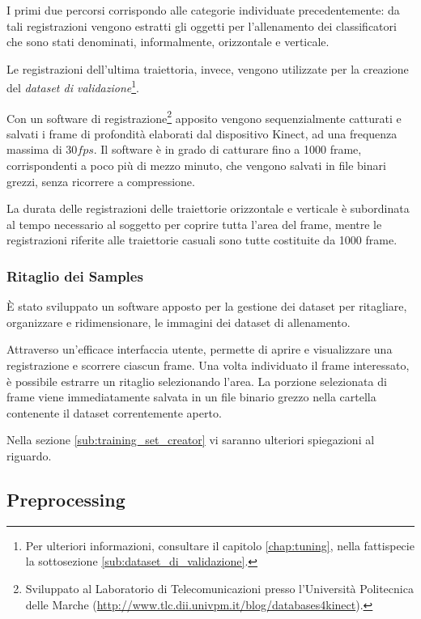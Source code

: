                 I primi due percorsi corrispondo alle categorie individuate precedentemente: da tali registrazioni vengono estratti gli oggetti per l'allenamento dei classificatori che sono stati denominati, informalmente, orizzontale e verticale.

                Le registrazioni dell'ultima traiettoria, invece, vengono utilizzate per la creazione del \emph{dataset di validazione}\footnote{Per ulteriori informazioni, consultare il capitolo \ref{chap:tuning}, nella fattispecie la sottosezione \ref{sub:dataset_di_validazione}.}.

                Con un software di registrazione\footnote{Sviluppato al Laboratorio di Telecomunicazioni presso l'Università Politecnica delle Marche (\url{http://www.tlc.dii.univpm.it/blog/databases4kinect}).} apposito vengono sequenzialmente catturati e salvati i frame di profondità elaborati dal dispositivo Kinect, ad una frequenza massima di $30 fps$.
                Il software è in grado di catturare fino a 1000 frame, corrispondenti a poco più di mezzo minuto, che vengono salvati in file binari grezzi, senza ricorrere a compressione.

                La durata delle registrazioni delle traiettorie orizzontale e verticale è subordinata al tempo necessario al soggetto per coprire tutta l'area del frame, mentre le registrazioni riferite alle traiettorie casuali sono tutte costituite da 1000 frame.

            \subsubsection{Ritaglio dei Samples}
                È stato sviluppato un software apposto per la gestione dei dataset per ritagliare, organizzare e ridimensionare, le immagini dei dataset di allenamento.

                Attraverso un'efficace interfaccia utente, permette di aprire e visualizzare una registrazione e scorrere ciascun frame. 
                Una volta individuato il frame interessato, è possibile estrarre un ritaglio selezionando l'area. 
                La porzione selezionata di frame viene immediatamente salvata in un file binario grezzo nella cartella contenente il dataset correntemente aperto.

                Nella sezione \ref{sub:training_set_creator} vi saranno ulteriori spiegazioni al riguardo.

        \subsection{Preprocessing}
        \label{sub:preprocessing}
